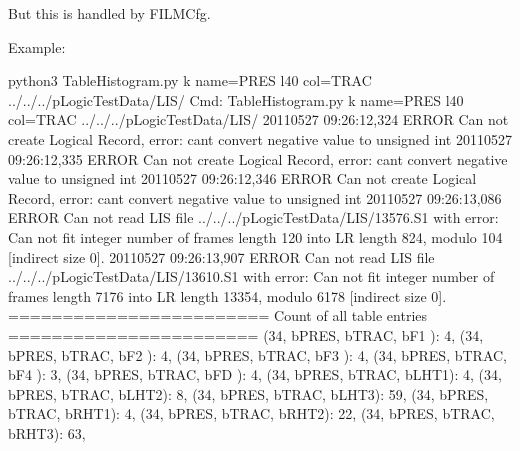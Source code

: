 \documentclass[letterpaper,10pt,english]{sphinxmanual}
\begin{document}
But this is handled by FILMCfg.

Example:

\begin{sphinxVerbatim}[commandchars=\\\{\}]
\PYGZdl{} python3 TableHistogram.py \PYGZhy{}k \PYGZhy{}\PYGZhy{}name=PRES \PYGZhy{}l40 \PYGZhy{}\PYGZhy{}col=TRAC ../../../pLogicTestData/LIS/
Cmd: TableHistogram.py \PYGZhy{}k \PYGZhy{}\PYGZhy{}name=PRES \PYGZhy{}l40 \PYGZhy{}\PYGZhy{}col=TRAC ../../../pLogicTestData/LIS/
2011\PYGZhy{}05\PYGZhy{}27 09:26:12,324 ERROR    Can not create Logical Record, error: can\PYGZsq{}t convert negative value to unsigned int
2011\PYGZhy{}05\PYGZhy{}27 09:26:12,335 ERROR    Can not create Logical Record, error: can\PYGZsq{}t convert negative value to unsigned int
2011\PYGZhy{}05\PYGZhy{}27 09:26:12,346 ERROR    Can not create Logical Record, error: can\PYGZsq{}t convert negative value to unsigned int
2011\PYGZhy{}05\PYGZhy{}27 09:26:13,086 ERROR    Can not read LIS file ../../../pLogicTestData/LIS/13576.S1 with error: Can not fit integer number of frames length 120 into LR length 824, modulo 104 [indirect size 0].
2011\PYGZhy{}05\PYGZhy{}27 09:26:13,907 ERROR    Can not read LIS file ../../../pLogicTestData/LIS/13610.S1 with error: Can not fit integer number of frames length 7176 into LR length 13354, modulo 6178 [indirect size 0].
======================== Count of all table entries =======================
\PYGZob{}\PYGZdq{}(34, b\PYGZsq{}PRES\PYGZsq{}, b\PYGZsq{}TRAC\PYGZsq{}, b\PYGZsq{}F1  \PYGZsq{})\PYGZdq{}: 4,
 \PYGZdq{}(34, b\PYGZsq{}PRES\PYGZsq{}, b\PYGZsq{}TRAC\PYGZsq{}, b\PYGZsq{}F2  \PYGZsq{})\PYGZdq{}: 4,
 \PYGZdq{}(34, b\PYGZsq{}PRES\PYGZsq{}, b\PYGZsq{}TRAC\PYGZsq{}, b\PYGZsq{}F3  \PYGZsq{})\PYGZdq{}: 4,
 \PYGZdq{}(34, b\PYGZsq{}PRES\PYGZsq{}, b\PYGZsq{}TRAC\PYGZsq{}, b\PYGZsq{}F4  \PYGZsq{})\PYGZdq{}: 3,
 \PYGZdq{}(34, b\PYGZsq{}PRES\PYGZsq{}, b\PYGZsq{}TRAC\PYGZsq{}, b\PYGZsq{}FD  \PYGZsq{})\PYGZdq{}: 4,
 \PYGZdq{}(34, b\PYGZsq{}PRES\PYGZsq{}, b\PYGZsq{}TRAC\PYGZsq{}, b\PYGZsq{}LHT1\PYGZsq{})\PYGZdq{}: 4,
 \PYGZdq{}(34, b\PYGZsq{}PRES\PYGZsq{}, b\PYGZsq{}TRAC\PYGZsq{}, b\PYGZsq{}LHT2\PYGZsq{})\PYGZdq{}: 8,
 \PYGZdq{}(34, b\PYGZsq{}PRES\PYGZsq{}, b\PYGZsq{}TRAC\PYGZsq{}, b\PYGZsq{}LHT3\PYGZsq{})\PYGZdq{}: 59,
 \PYGZdq{}(34, b\PYGZsq{}PRES\PYGZsq{}, b\PYGZsq{}TRAC\PYGZsq{}, b\PYGZsq{}RHT1\PYGZsq{})\PYGZdq{}: 4,
 \PYGZdq{}(34, b\PYGZsq{}PRES\PYGZsq{}, b\PYGZsq{}TRAC\PYGZsq{}, b\PYGZsq{}RHT2\PYGZsq{})\PYGZdq{}: 22,
 \PYGZdq{}(34, b\PYGZsq{}PRES\PYGZsq{}, b\PYGZsq{}TRAC\PYGZsq{}, b\PYGZsq{}RHT3\PYGZsq{})\PYGZdq{}: 63,

\end{sphinxVerbatim}
\end{document}

